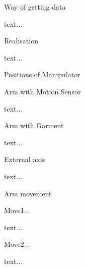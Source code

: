 \chap Way of getting data

text...

\sec Realisation

text...

\sec Positions of Manipulator

\secc Arm with Motion Sensor

text...

\secc Arm with Garment

text...

\secc External axis

text...

\sec Arm movement

\secc Move1...

text...

\secc Move2...

text...


